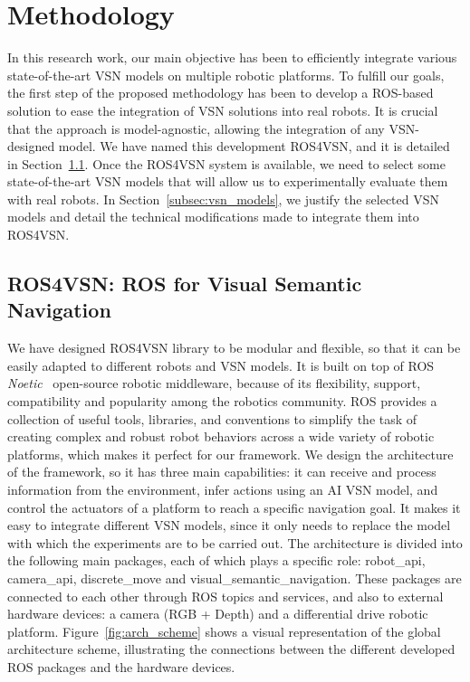\section{Methodology}\label{sec:methodology}
In this research work, our main objective has been to efficiently integrate various state-of-the-art VSN models on multiple robotic platforms.
To fulfill our goals, the first step of the proposed methodology has been to develop a ROS-based solution to ease the integration of VSN solutions into real robots.
It is crucial that the approach is model-agnostic, allowing the integration of any VSN-designed model.
We have named this development ROS4VSN, and it is detailed in Section~\ref{subsec:ros4vsn}.
Once the ROS4VSN system is available, we need to select some state-of-the-art VSN models that will allow us to experimentally evaluate them with real robots.
In Section~\ref{subsec:vsn_models}, we justify the selected VSN models and detail the technical modifications made to integrate them into ROS4VSN\@.


\subsection{ROS4VSN: ROS for Visual Semantic Navigation}
\label{subsec:ros4vsn}

We have designed ROS4VSN library to be modular and flexible, so that it can be easily adapted to different robots and VSN models.
It is built on top of ROS \textit{Noetic}~\cite{ros} open-source robotic middleware, because of its flexibility, support, compatibility and popularity among the robotics community.
ROS provides a collection of useful tools, libraries, and conventions to simplify the task of creating complex and robust robot behaviors across a wide variety of robotic platforms, which makes it perfect for our framework.
We design the architecture of the framework, so it has three main capabilities: it can receive and process information from the environment, infer actions using an AI VSN model, and control the actuators of a platform to reach a specific navigation goal.
It makes it easy to integrate different VSN models, since it only needs to replace the model with which the experiments are to be carried out.
The architecture is divided into the following main packages, each of which plays a specific role: robot\_api, camera\_api, discrete\_move and visual\_semantic\_navigation.
These packages are connected to each other through ROS topics and services, and also to external hardware devices: a camera (RGB + Depth) and a differential drive robotic platform.
Figure~\ref{fig:arch_scheme} shows a visual representation of the global architecture scheme, illustrating the connections between the different developed ROS packages and the hardware devices.

